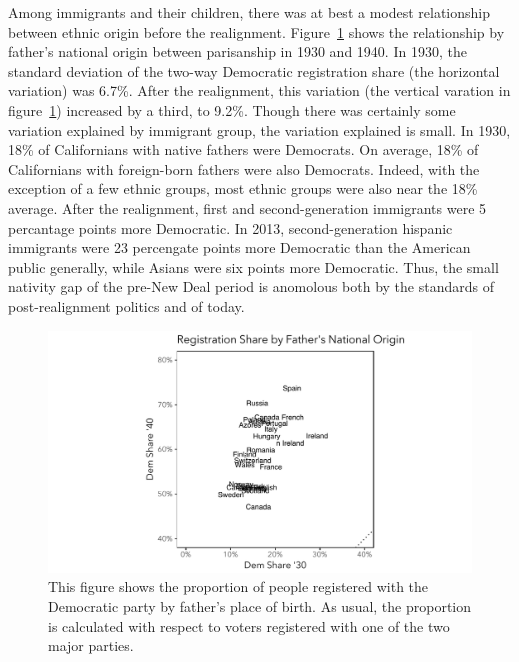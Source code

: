 \documentclass[11pt]{scrartcl}\usepackage[]{graphicx}\usepackage[]{color}
\makeatletter
\def\maxwidth{ %
  \ifdim\Gin@nat@width>\linewidth
    \linewidth
  \else
    \Gin@nat@width
  \fi
}
\newenvironment{knitrout}{}{} %
\makeatother
\begin{document}
Among immigrants and their children, there was at best a modest relationship between ethnic origin before the realignment.  Figure~\ref{fig:natl_origin} shows the relationship by father's national origin between parisanship in 1930 and 1940. In 1930, the standard deviation of the two-way Democratic registration share (the horizontal variation) was 6.7\%. After the realignment, this variation (the vertical varation in figure~\ref{fig:natl_origin}) increased by a third, to 9.2\%.  Though there was certainly some variation explained by immigrant group, the variation explained is small.  In 1930, 18\% of Californians with native fathers were Democrats. On average, 18\% of Californians with foreign-born fathers were also Democrats. Indeed, with the exception of a few ethnic groups, most ethnic groups were also near the 18\% average. After the realignment, first and second-generation immigrants were 5 percantage points more Democratic. In 2013, second-generation hispanic immigrants were 23 percengate points more Democratic than the American public generally, while Asians were six points more Democratic. Thus, the small nativity gap of the pre-New Deal period is anomolous both by the standards of post-realignment politics and of today.

\begin{knitrout}
\color{fgcolor}\begin{figure}

{\centering \includegraphics[width=\maxwidth]{figures/plots-natl_origin-1} 

}

\caption[This figure shows the proportion of people registered with the Democratic party by father's place of birth]{This figure shows the proportion of people registered with the Democratic party by father's place of birth. As usual, the proportion is calculated with respect to voters registered with one of the two major parties.}\label{fig:natl_origin}
\end{figure}


\end{knitrout}
\end{document}
